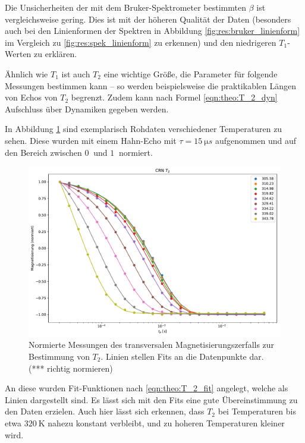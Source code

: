 Die Unsicherheiten der mit dem Bruker-Spektrometer bestimmten $\beta$ ist vergleichsweise gering. Dies ist mit der höheren Qualität der Daten (besonders auch bei den Linienformen der Spektren in Abbildung \ref{fig:res:bruker_linienform} im Vergleich zu \ref{fig:res:spek_linienform} zu erkennen) und den niedrigeren $T_1$-Werten zu erklären.



\par\bigskip


Ähnlich wie $T_1$ ist auch $T_2$ eine wichtige Größe, die Parameter für folgende Messungen bestimmen kann -- so werden beispielsweise die praktikablen Längen von Echos von $T_2$ begrenzt. Zudem kann nach Formel \eqref{eqn:theo:T_2_dyn} Aufschluss über Dynamiken gegeben werden.

In Abbildung \ref{fig:res:T_2_roh} sind exemplarisch Rohdaten verschiedener Temperaturen zu sehen. Diese wurden mit einem Hahn-Echo mit $\tau = \SI{15}{\micro s}$ aufgenommen und auf den Bereich zwischen $\SI{0}{}$ und $\SI{1}{}$ normiert.
\begin{figure}
	\begin{center}
		\includegraphics[width=.9\textwidth]{graphics/plots/T2/t2_roh.pdf}
	\end{center}
	\caption{Normierte Messungen des transversalen Magnetisierungszerfalls zur Bestimmung von $T_2$. Linien stellen Fits an die Datenpunkte dar. (*** richtig normieren)} \label{fig:res:T_2_roh}
\end{figure}

An diese wurden Fit-Funktionen nach \eqref{eqn:theo:T_2_fit} angelegt, welche als Linien dargestellt sind. Es lässt sich mit den Fits eine gute Übereinstimmung zu den Daten erzielen. Auch hier lässt sich erkennen, dass $T_2$ bei Temperaturen bis etwa $\SI{320}{\kelvin}$ nahezu konstant verbleibt, und zu hoheren Temperaturen kleiner wird.

